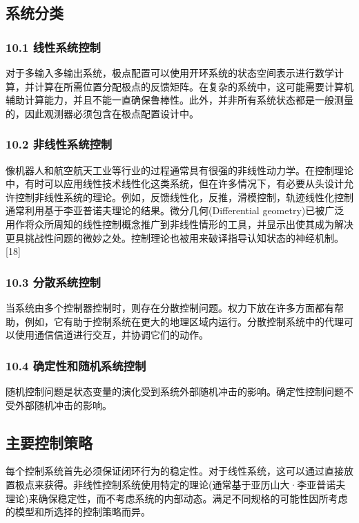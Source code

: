 \subsection{系统分类}

\subsubsection{10.1 线性系统控制}

对于多输入多输出系统，极点配置可以使用开环系统的状态空间表示进行数学计算，并计算在所需位置分配极点的反馈矩阵。在复杂的系统中，这可能需要计算机辅助计算能力，并且不能一直确保鲁棒性。此外，并非所有系统状态都是一般测量的，因此观测器必须包含在极点配置设计中。

\subsubsection{10.2 非线性系统控制}

像机器人和航空航天工业等行业的过程通常具有很强的非线性动力学。在控制理论中，有时可以应用线性技术线性化这类系统，但在许多情况下，有必要从头设计允许控制非线性系统的理论。例如，反馈线性化，反推，滑模控制，轨迹线性化控制通常利用基于李亚普诺夫理论的结果。微分几何(Differential geometry)已被广泛用作将众所周知的线性控制概念推广到非线性情形的工具，并显示出使其成为解决更具挑战性问题的微妙之处。控制理论也被用来破译指导认知状态的神经机制。[18]

\subsubsection{10.3 分散系统控制}

当系统由多个控制器控制时，则存在分散控制问题。权力下放在许多方面都有帮助，例如，它有助于控制系统在更大的地理区域内运行。分散控制系统中的代理可以使用通信信道进行交互，并协调它们的动作。

\subsubsection{10.4 确定性和随机系统控制}

随机控制问题是状态变量的演化受到系统外部随机冲击的影响。确定性控制问题不受外部随机冲击的影响。

\subsection{主要控制策略}

每个控制系统首先必须保证闭环行为的稳定性。对于线性系统，这可以通过直接放置极点来获得。非线性控制系统使用特定的理论(通常基于亚历山大·李亚普诺夫理论)来确保稳定性，而不考虑系统的内部动态。满足不同规格的可能性因所考虑的模型和所选择的控制策略而异。

